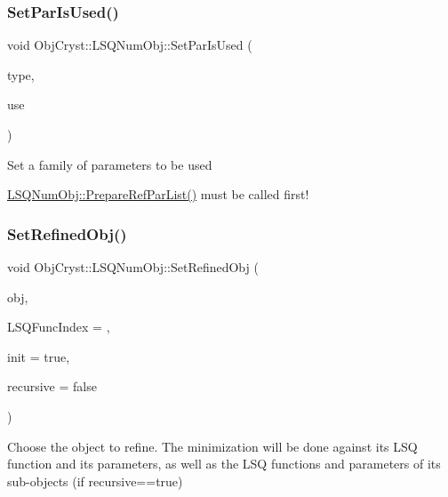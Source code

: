 \subsubsection{\texorpdfstring{SetParIsUsed()}{SetParIsUsed()}\hspace{0.1cm}{\footnotesize\ttfamily [2/2]}}
{\footnotesize\ttfamily void Obj\+Cryst\+::\+L\+S\+Q\+Num\+Obj\+::\+Set\+Par\+Is\+Used (\begin{DoxyParamCaption}\item[{const \mbox{\hyperlink{class_obj_cryst_1_1_ref_par_type}{Ref\+Par\+Type}} $\ast$}]{type,  }\item[{const bool}]{use }\end{DoxyParamCaption})}

Set a family of parameters to be used

\mbox{\hyperlink{class_obj_cryst_1_1_l_s_q_num_obj_afdeb58450a3e0506fc02a0b5df15a600}{L\+S\+Q\+Num\+Obj\+::\+Prepare\+Ref\+Par\+List()}} must be called first! \mbox{\label{class_obj_cryst_1_1_l_s_q_num_obj_ac093bab1bcb43aa4ea00f63fdb53063f}} 
\subsubsection{\texorpdfstring{SetRefinedObj()}{SetRefinedObj()}}
{\footnotesize\ttfamily void Obj\+Cryst\+::\+L\+S\+Q\+Num\+Obj\+::\+Set\+Refined\+Obj (\begin{DoxyParamCaption}\item[{\mbox{\hyperlink{class_obj_cryst_1_1_refinable_obj}{Refinable\+Obj}} \&}]{obj,  }\item[{const unsigned int}]{L\+S\+Q\+Func\+Index = {},  }\item[{const bool}]{init = {\ttfamily true},  }\item[{const bool}]{recursive = {\ttfamily false} }\end{DoxyParamCaption})}

Choose the object to refine. The minimization will be done against its L\+SQ function and its parameters, as well as the L\+SQ functions and parameters of its sub-\/objects (if recursive==true)


